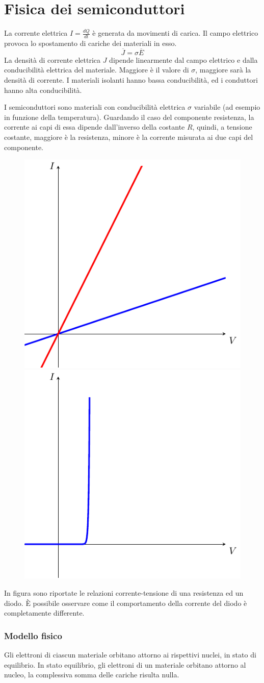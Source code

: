 \documentclass[../template]{subfiles}
\newcommand{\idiff}{\ensuremath{I = \frac{dQ}{dt}}}
\begin{document}
\section{Fisica dei semiconduttori}
La corrente elettrica $\idiff$ è generata da movimenti di carica. Il campo elettrico provoca lo spostamento di cariche dei materiali in esso.
\[
    \overline{J} = \sigma \overline{E}
\]
La densità di corrente elettrica $J$ dipende linearmente dal campo elettrico e dalla conducibilità elettrica del materiale.
Maggiore è il valore di $\sigma$, maggiore sarà la densità di corrente. I materiali isolanti hanno bassa conducibilità, ed i conduttori hanno alta conducibilità.

I semiconduttori sono materiali con conducibilità elettrica $\sigma$ variabile (ad esempio in funzione della temperatura).
Guardando il caso del componente resistenza, la corrente ai capi di essa dipende dall'inverso della costante $R$, quindi, a tensione costante, maggiore è la resistenza, minore è la corrente misurata ai due capi del componente.

\begin{figure}[h]
    \centering
    \includegraphics[width=.30\textwidth]{img/resistence-current}
    \includegraphics[width=.30\textwidth]{img/diode-current-graph}
\end{figure}
In figura sono riportate le relazioni corrente-tensione di una resistenza ed un diodo. È possibile osservare come il comportamento della corrente del diodo è completamente differente.

\subsubsection{Modello fisico}
Gli elettroni di ciascun materiale orbitano attorno ai rispettivi nuclei, in stato di equilibrio.
In stato equilibrio, gli elettroni di un materiale orbitano attorno al nucleo, la complessiva somma delle cariche risulta nulla.
\end{document}
